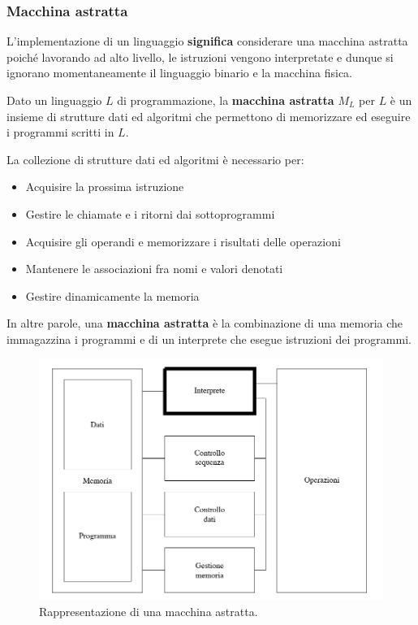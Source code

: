 \documentclass[a4paper]{article}
\begin{document}
	\subsubsection{Macchina astratta}

	\noindent
	L'implementazione di un linguaggio \textbf{significa} considerare una macchina astratta poiché lavorando ad alto livello, le istruzioni vengono interpretate e dunque si ignorano momentaneamente il linguaggio binario e la macchina fisica.
	\begin{boxdef}
		Dato un linguaggio $L$ di programmazione, la \textcolor{Red3}{\textbf{macchina astratta}} $M_{L}$ per $L$ è un insieme di strutture dati ed algoritmi che permettono di memorizzare ed eseguire i programmi scritti in $L$.
	\end{boxdef}
	
	\noindent
	La collezione di strutture dati ed algoritmi è necessario per:
	\begin{itemize}
		\item Acquisire la prossima istruzione
		
		\item Gestire le chiamate e i ritorni dai sottoprogrammi
		
		\item Acquisire gli operandi e memorizzare i risultati delle operazioni
		
		\item Mantenere le associazioni fra nomi e valori denotati
		
		\item Gestire dinamicamente la memoria
	\end{itemize}

	\noindent
	In altre parole, una \textbf{macchina astratta} è la combinazione di una memoria che immagazzina i programmi e di un interprete che esegue istruzioni dei programmi.
	\begin{figure}[!htp]
		\centering
		\includegraphics[width=\textwidth]{img/macchina_astratta.png}
		\caption{Rappresentazione di una macchina astratta.}
	\end{figure}
	
\end{document}
